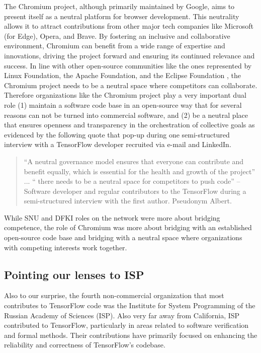 \documentclass[CHICAGO,Times1COL]{WileyNJDv5} %
\begin{document}
The Chromium project, although primarily maintained by Google, aims to present itself as a neutral platform for browser development. This neutrality allows it to attract contributions from other major tech companies like Microsoft (for Edge), Opera, and Brave. By fostering an inclusive and collaborative environment, Chromium can benefit from a wide range of expertise and innovations, driving the project forward and ensuring its continued relevance and success.
In line with other open-source communities like the ones represented by Linux Foundation, the Apache Foundation, and the Eclipse Foundation \citep[see][for work on conflict of interest in open-source foundations]{weikert2019managing}, the Chromium project needs to be a neutral space where competitors can collaborate.  Therefore organizations like the Chromium project play a very important dual role (1) maintain a software code base in an open-source way that for several reasons can not be turned into commercial software, and (2) be a neutral place that ensures openness and transparency in the orchestration of collective goals as evidenced by the following quote that pop-up during one semi-structured interview with a TensorFlow developer recruited via e-mail and LinkedIn.  

\begin{quotation}
``A neutral governance model ensures that everyone can contribute and benefit equally, which is essential for the health and growth of the project'' ... `` there needs to be a neutral space for competitors to push code''  -- Software developer  and regular contributors to the TensorFlow during a semi-structured interview with the first author.  Pseudonym Albert. 
\end{quotation}


While SNU and DFKI roles on the network were more about bridging competence, the role of Chromium was more about bridging with an established open-source code base and bridging with a neutral space where organizations with competing interests work together. 


\subsection{Pointing our lenses to ISP}


Also to our surprise, the fourth non-commercial organization that most contributes to TensorFlow code was the Institute for System Programming of the Russian Academy of Sciences (ISP). Also 
very far away from California, ISP  contributed to TensorFlow, particularly in areas related to software verification and formal methods. Their contributions have primarily focused on enhancing the reliability and correctness of TensorFlow's codebase.
\end{document}
